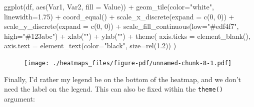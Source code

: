 \documentclass[
  letterpaper,
  DIV=11,
  numbers=noendperiod]{scrreprt}
\newenvironment{Shaded}{\begin{snugshade}}{\end{snugshade}}
\newcommand{\AttributeTok}[1]{\textcolor[rgb]{0.40,0.45,0.13}{#1}}
\newcommand{\DecValTok}[1]{\textcolor[rgb]{0.68,0.00,0.00}{#1}}
\newcommand{\FloatTok}[1]{\textcolor[rgb]{0.68,0.00,0.00}{#1}}
\newcommand{\FunctionTok}[1]{\textcolor[rgb]{0.28,0.35,0.67}{#1}}
\newcommand{\NormalTok}[1]{\textcolor[rgb]{0.00,0.23,0.31}{#1}}
\newcommand{\SpecialCharTok}[1]{\textcolor[rgb]{0.37,0.37,0.37}{#1}}
\newcommand{\StringTok}[1]{\textcolor[rgb]{0.13,0.47,0.30}{#1}}
\begin{document}
\begin{Shaded}
\begin{Highlighting}[]
\FunctionTok{ggplot}\NormalTok{(df, }\FunctionTok{aes}\NormalTok{(Var1, Var2, }\AttributeTok{fill =}\NormalTok{ Value)) }\SpecialCharTok{+} 
  \FunctionTok{geom\_tile}\NormalTok{(}\AttributeTok{color=}\StringTok{"white"}\NormalTok{, }\AttributeTok{linewidth=}\FloatTok{1.75}\NormalTok{) }\SpecialCharTok{+}
  \FunctionTok{coord\_equal}\NormalTok{() }\SpecialCharTok{+}
  \FunctionTok{scale\_x\_discrete}\NormalTok{(}\AttributeTok{expand =} \FunctionTok{c}\NormalTok{(}\DecValTok{0}\NormalTok{, }\DecValTok{0}\NormalTok{)) }\SpecialCharTok{+}
  \FunctionTok{scale\_y\_discrete}\NormalTok{(}\AttributeTok{expand =} \FunctionTok{c}\NormalTok{(}\DecValTok{0}\NormalTok{, }\DecValTok{0}\NormalTok{)) }\SpecialCharTok{+} 
  \FunctionTok{scale\_fill\_continuous}\NormalTok{(}\AttributeTok{low=}\StringTok{"\#edf4f7"}\NormalTok{, }\AttributeTok{high=}\StringTok{"\#123abc"}\NormalTok{) }\SpecialCharTok{+}
  \FunctionTok{xlab}\NormalTok{(}\StringTok{""}\NormalTok{) }\SpecialCharTok{+} 
  \FunctionTok{ylab}\NormalTok{(}\StringTok{""}\NormalTok{) }\SpecialCharTok{+}
  \FunctionTok{theme}\NormalTok{(}
    \AttributeTok{axis.ticks =} \FunctionTok{element\_blank}\NormalTok{(), }
    \AttributeTok{axis.text =} \FunctionTok{element\_text}\NormalTok{(}\AttributeTok{color=}\StringTok{"black"}\NormalTok{, }\AttributeTok{size=}\FunctionTok{rel}\NormalTok{(}\FloatTok{1.2}\NormalTok{))}
\NormalTok{  )}
\end{Highlighting}
\end{Shaded}

\begin{figure}[H]

{\centering \texttt{[image: ./heatmaps\_files/figure-pdf/unnamed-chunk-8-1.pdf]}

}

\end{figure}

Finally, I'd rather my legend be on the bottom of the heatmap, and we
don't need the label on the legend. This can also be fixed within the
\texttt{theme()} argument:
\end{document}
